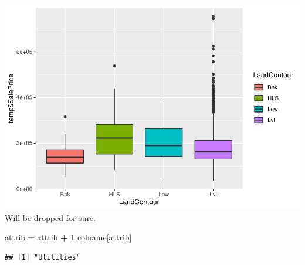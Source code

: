 \documentclass[]{article}
\newenvironment{Shaded}{\begin{snugshade}}{\end{snugshade}}
\newcommand{\DecValTok}[1]{\textcolor[rgb]{0.00,0.00,0.81}{#1}}
\newcommand{\StringTok}[1]{\textcolor[rgb]{0.31,0.60,0.02}{#1}}
\newcommand{\OperatorTok}[1]{\textcolor[rgb]{0.81,0.36,0.00}{\textbf{#1}}}
\newcommand{\NormalTok}[1]{#1}
\begin{document}
\includegraphics{EDA_files/figure-latex/unnamed-chunk-31-1.pdf} Will be
dropped for sure.

\begin{Shaded}
\begin{Highlighting}[]
\NormalTok{attrib =}\StringTok{ }\NormalTok{attrib }\OperatorTok{+}\StringTok{ }\DecValTok{1}
\NormalTok{colname[attrib]}
\end{Highlighting}
\end{Shaded}

\begin{verbatim}
## [1] "Utilities"
\end{verbatim}
\end{document}
